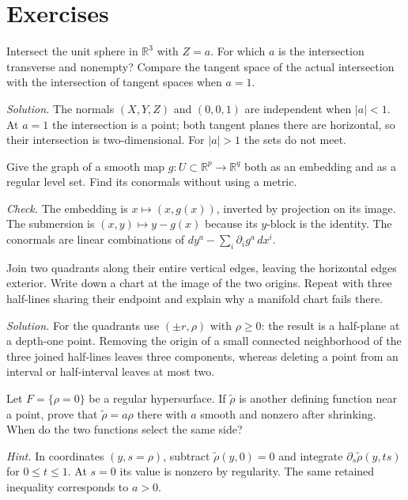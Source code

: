 \section*{Exercises}
\begin{exercise}Intersect the unit sphere in $\mathbb R^3$ with $Z=a$. For which $a$ is the intersection transverse and nonempty? Compare the tangent space of the actual intersection with the intersection of tangent spaces when $a=1$.\end{exercise}
\noindent\emph{Solution.} The normals $(X,Y,Z)$ and $(0,0,1)$ are independent when $|a|<1$. At $a=1$ the intersection is a point; both tangent planes there are horizontal, so their intersection is two-dimensional. For $|a|>1$ the sets do not meet.
\begin{exercise}Give the graph of a smooth map $g:U\subset\mathbb R^p\to\mathbb R^q$ both as an embedding and as a regular level set. Find its conormals without using a metric.\end{exercise}
\noindent\emph{Check.} The embedding is $x\mapsto(x,g(x))$, inverted by projection on its image. The submersion is $(x,y)\mapsto y-g(x)$ because its $y$-block is the identity. The conormals are linear combinations of $dy^a-\sum_i\partial_i g^a\,dx^i$.
\begin{exercise}Join two quadrants along their entire vertical edges, leaving the horizontal edges exterior. Write down a chart at the image of the two origins. Repeat with three half-lines sharing their endpoint and explain why a manifold chart fails there.\end{exercise}
\noindent\emph{Solution.} For the quadrants use $(\pm r,\rho)$ with $\rho\ge0$: the result is a half-plane at a depth-one point. Removing the origin of a small connected neighborhood of the three joined half-lines leaves three components, whereas deleting a point from an interval or half-interval leaves at most two.
\begin{exercise}Let $F=\{\rho=0\}$ be a regular hypersurface. If $\tilde\rho$ is another defining function near a point, prove that $\tilde\rho=a\rho$ there with $a$ smooth and nonzero after shrinking. When do the two functions select the same side?\end{exercise}
\noindent\emph{Hint.} In coordinates $(y,s=\rho)$, subtract $\tilde\rho(y,0)=0$ and integrate $\partial_s\tilde\rho(y,ts)$ for $0\le t\le1$. At $s=0$ its value is nonzero by regularity. The same retained inequality corresponds to $a>0$.
